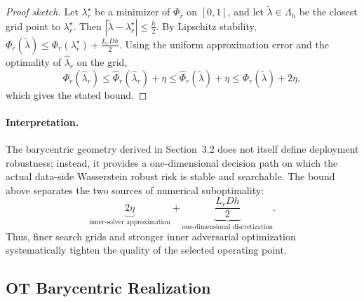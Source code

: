 \begin{proof}[Proof sketch]
Let $\lambda_r^\star$ be a minimizer of $\Phi_r$ on $[0,1]$, and let
$\widetilde\lambda\in\Lambda_h$ be the closest grid point to
$\lambda_r^\star$. Then
$
|\widetilde\lambda-\lambda_r^\star|
\le
\frac h2.
$
By Lipschitz stability,
$
\Phi_r(\widetilde\lambda)
\le
\Phi_r(\lambda_r^\star)
+
\frac{L_rDh}{2}.
$
Using the uniform approximation error and the optimality of
$\widehat\lambda_r$ on the grid,
\[
\Phi_r(\widehat\lambda_r)
\le
\widehat\Phi_r(\widehat\lambda_r)+\eta
\le
\widehat\Phi_r(\widetilde\lambda)+\eta
\le
\Phi_r(\widetilde\lambda)+2\eta,
\]
which gives the stated bound.\end{proof}

\paragraph{Interpretation.}
The barycentric geometry derived in Section~3.2 does not itself define
deployment robustness; instead, it provides a one-dimensional decision
path on which the actual data-side Wasserstein robust risk is stable and
searchable. The bound above separates the two sources of numerical
suboptimality:
\[
\underbrace{2\eta}_{\text{inner-solver approximation}}
+
\underbrace{\frac{L_rDh}{2}}_{\text{one-dimensional discretization}}.
\]
Thus, finer search grids and stronger inner adversarial optimization
systematically tighten the quality of the selected operating point.





\subsection{OT Barycentric Realization}
\label{sec:transport}


